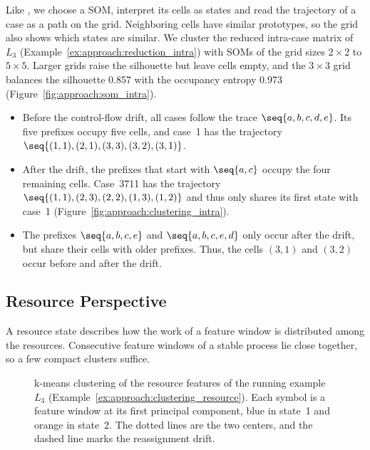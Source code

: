 \begin{example}
	\label{ex:approach:clustering_intra}
	Like \textcite{berti2025ocel}, we choose a SOM, interpret its cells as states and read the trajectory of a case as a path on the grid. Neighboring cells have similar prototypes, so the grid also shows which states are similar. We cluster the reduced intra-case matrix of $L_3$ (Example~\ref{ex:approach:reduction_intra}) with SOMs of the grid sizes $2 \times 2$ to $5 \times 5$. Larger grids raise the silhouette but leave cells empty, and the $3 \times 3$ grid balances the silhouette 0.857 with the occupancy entropy 0.973 (Figure~\ref{fig:approach:som_intra}).
	\begin{itemize}
		\item Before the control-flow drift, all cases follow the trace $\seq{a, b, c, d, e}$. Its five prefixes occupy five cells, and case~1 has the trajectory $\seq{(1, 1),\allowbreak (2, 1),\allowbreak (3, 3),\allowbreak (3, 2),\allowbreak (3, 1)}$.

		\item After the drift, the prefixes that start with $\seq{a, c}$ occupy the four remaining cells. Case~3711 has the trajectory $\seq{(1, 1),\allowbreak (2, 3),\allowbreak (2, 2),\allowbreak (1, 3),\allowbreak (1, 2)}$ and thus only shares its first state with case~1 (Figure~\ref{fig:approach:clustering_intra}).

		\item The prefixes $\seq{a, b, c, e}$ and $\seq{a, b, c, e, d}$ only occur after the drift, but share their cells with older prefixes. Thus, the cells $(3, 1)$ and $(3, 2)$ occur before and after the drift.
	\end{itemize}
\end{example}

\subsection{Resource Perspective}
\label{sec:approach:clustering:resource}
A resource state describes how the work of a feature window is distributed among the resources. Consecutive feature windows of a stable process lie close together, so a few compact clusters suffice.

\begin{figure}[tb]
	\centering
	
	\caption[Resource clustering of the running example]{%
		k-means clustering of the resource features of the running example $L_3$ (Example~\ref{ex:approach:clustering_resource}). Each symbol is a feature window at its first principal component, blue in state~1 and orange in state~2. The dotted lines are the two centers, and the dashed line marks the reassignment drift.}
	\label{fig:approach:clustering_resource}
\end{figure}

